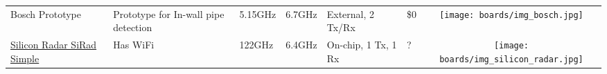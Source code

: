 \begin{longtable}[]{@{}llllllc@{}}
\begin{minipage}[t]{\colwidthA}\raggedright\strut
Bosch Prototype
\strut\end{minipage} &
\begin{minipage}[t]{\colwidthB}\raggedright\strut
Prototype for In-wall pipe detection
\strut\end{minipage} &
\begin{minipage}[t]{\colwidthC}\raggedright\strut
5.15GHz
\strut\end{minipage} &
\begin{minipage}[t]{\colwidthD}\raggedright\strut
6.7GHz
\strut\end{minipage} &
\begin{minipage}[t]{\colwidthE}\raggedright\strut
External, 2 Tx/Rx
\strut\end{minipage} &
\begin{minipage}[t]{\colwidthF}\raggedright\strut
\$0
\strut\end{minipage} &
\begin{minipage}[t]{\colwidthG}\centering\strut
\texttt{[image: boards/img\_bosch.jpg]}
\strut\end{minipage}\tabularnewline

\begin{minipage}[t]{\colwidthA}\raggedright\strut
	\href{http://www.siliconradar.de/evalkits_e.html}{Silicon Radar SiRad Simple}
\strut\end{minipage} &
\begin{minipage}[t]{\colwidthB}\raggedright\strut
Has WiFi
\strut\end{minipage} &
\begin{minipage}[t]{\colwidthC}\raggedright\strut
122GHz
\strut\end{minipage} &
\begin{minipage}[t]{\colwidthD}\raggedright\strut
6.4GHz
\strut\end{minipage} &
\begin{minipage}[t]{\colwidthE}\raggedright\strut
On-chip, 1 Tx, 1 Rx
\strut\end{minipage} &
\begin{minipage}[t]{\colwidthF}\raggedright\strut
?
\strut\end{minipage} &
\begin{minipage}[t]{\colwidthG}\centering\strut
\texttt{[image: boards/img\_silicon\_radar.jpg]}

\strut\end{minipage}\tabularnewline


\end{longtable}
